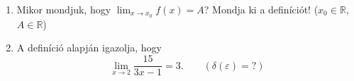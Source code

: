 \documentclass[11pt]{scrartcl}
\begin{document}
\begin{enumerate}
	\item Mikor mondjuk, hogy $\lim_{x \to x_0} f(x) = A$? Mondja ki a
	      definíciót! ($x_0 \in \mathbb{R}$, $A \in \mathbb{R}$)

	\item A definíció alapján igazolja, hogy
	      \[
		      \lim_{x \to 2} \frac{15}{3x - 1} = 3. \qquad (\delta(\varepsilon) = ?)
	      \]
\end{enumerate}
\end{document}
